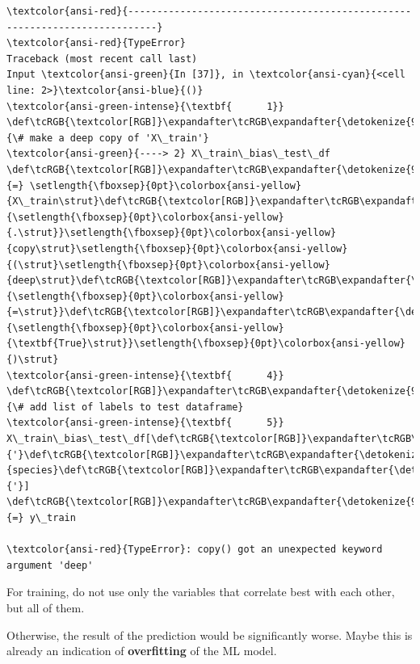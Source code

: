 \documentclass [oneside,10pt,a4paper,ngerman,BCOR10mm,headsepline,parindent,final]{scrartcl}
\begin{document}
    \begin{Verbatim}[commandchars=\\\{\}, frame=single, framerule=2mm, rulecolor=\color{outerrorbackground}]
\textcolor{ansi-red}{---------------------------------------------------------------------------}
\textcolor{ansi-red}{TypeError}                                 Traceback (most recent call last)
Input \textcolor{ansi-green}{In [37]}, in \textcolor{ansi-cyan}{<cell line: 2>}\textcolor{ansi-blue}{()}
\textcolor{ansi-green-intense}{\textbf{      1}} \def\tcRGB{\textcolor[RGB]}\expandafter\tcRGB\expandafter{\detokenize{95,135,135}}{\# make a deep copy of 'X\_train'}
\textcolor{ansi-green}{----> 2} X\_train\_bias\_test\_df \def\tcRGB{\textcolor[RGB]}\expandafter\tcRGB\expandafter{\detokenize{98,98,98}}{=} \setlength{\fboxsep}{0pt}\colorbox{ansi-yellow}{X\_train\strut}\def\tcRGB{\textcolor[RGB]}\expandafter\tcRGB\expandafter{\detokenize{98,98,98}}{\setlength{\fboxsep}{0pt}\colorbox{ansi-yellow}{.\strut}}\setlength{\fboxsep}{0pt}\colorbox{ansi-yellow}{copy\strut}\setlength{\fboxsep}{0pt}\colorbox{ansi-yellow}{(\strut}\setlength{\fboxsep}{0pt}\colorbox{ansi-yellow}{deep\strut}\def\tcRGB{\textcolor[RGB]}\expandafter\tcRGB\expandafter{\detokenize{98,98,98}}{\setlength{\fboxsep}{0pt}\colorbox{ansi-yellow}{=\strut}}\def\tcRGB{\textcolor[RGB]}\expandafter\tcRGB\expandafter{\detokenize{0,135,0}}{\setlength{\fboxsep}{0pt}\colorbox{ansi-yellow}{\textbf{True}\strut}}\setlength{\fboxsep}{0pt}\colorbox{ansi-yellow}{)\strut}
\textcolor{ansi-green-intense}{\textbf{      4}} \def\tcRGB{\textcolor[RGB]}\expandafter\tcRGB\expandafter{\detokenize{95,135,135}}{\# add list of labels to test dataframe}
\textcolor{ansi-green-intense}{\textbf{      5}} X\_train\_bias\_test\_df[\def\tcRGB{\textcolor[RGB]}\expandafter\tcRGB\expandafter{\detokenize{175,0,0}}{'}\def\tcRGB{\textcolor[RGB]}\expandafter\tcRGB\expandafter{\detokenize{175,0,0}}{species}\def\tcRGB{\textcolor[RGB]}\expandafter\tcRGB\expandafter{\detokenize{175,0,0}}{'}] \def\tcRGB{\textcolor[RGB]}\expandafter\tcRGB\expandafter{\detokenize{98,98,98}}{=} y\_train

\textcolor{ansi-red}{TypeError}: copy() got an unexpected keyword argument 'deep'
    \end{Verbatim}

    For training, do not use only the variables that correlate best with
each other, but all of them.

Otherwise, the result of the prediction would be significantly worse.
Maybe this is already an indication of \textbf{overfitting} of the ML
model.
\end{document}
